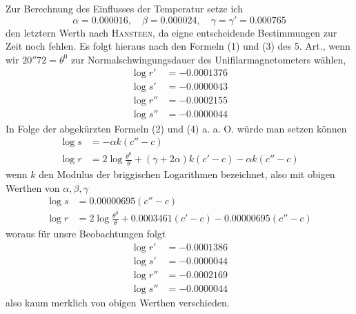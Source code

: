 Zur Berechnung des Einflusses der Temperatur setze ich
\[
\alpha=0.000016,\quad\beta=0.000024,\quad\gamma=\gamma'=0.000765
\]
den letztern Werth nach \textsc{Hansteen}, da eigne entscheidende Bestimmungen zur Zeit noch fehlen. Es folgt hieraus nach den Formeln (1) und (3) des 5. Art., wenn wir $20''72=\theta^0$ zur Normalschwingungsdauer des Unifilarmagnetometers wählen,
\[
\begin{aligned}
\log r'&=-0.0001376\\
\log s'&=-0.0000043\\
\log r''&=-0.0002155\\
\log s''&=-0.0000044
\end{aligned}
\]
In Folge der abgekürzten Formeln (2) und (4) a. a. O. würde man setzen können
\[
\begin{aligned}
\log s&=-\alpha k(c''-c)\\
\log r&=2\log\frac{\theta^0}{\theta}+(\gamma+2\alpha)k(c'-c)-\alpha k(c''-c)
\end{aligned}
\]
wenn $k$ den Modulus der briggischen Logarithmen bezeichnet, also mit obigen Werthen von $\alpha,\beta,\gamma$
\[
\begin{aligned}
\log s&=0.00000695(c''-c)\\
\log r&=2\log\frac{\theta^0}{\theta}+0.0003461(c'-c)-0.00000695(c''-c)
\end{aligned}
\]
woraus für unsre Beobachtungen folgt
\[
\begin{aligned}
\log r'&=-0.0001386\\
\log s'&=-0.0000044\\
\log r''&=-0.0002169\\
\log s''&=-0.0000044
\end{aligned}
\]
also kaum merklich von obigen Werthen verschieden.


